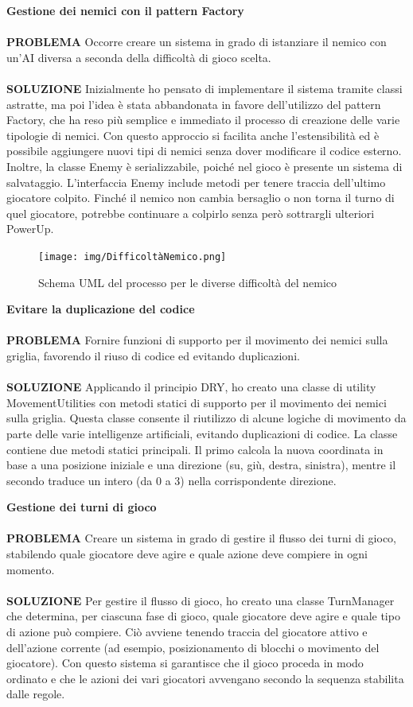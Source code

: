 \documentclass[a4paper,12pt]{report}
\begin{document}
\textbf{Gestione dei nemici con il pattern Factory}
\\
\\
\textbf{PROBLEMA}
Occorre creare un sistema in grado di istanziare il nemico con un’AI diversa a seconda della difficoltà di gioco scelta.
\\
\\
\textbf{SOLUZIONE}
Inizialmente ho pensato di implementare il sistema tramite classi astratte, ma poi l’idea è stata abbandonata in favore 
dell’utilizzo del pattern Factory, che ha reso più semplice e immediato il processo di creazione delle varie tipologie di nemici.
Con questo approccio si facilita anche l’estensibilità ed è possibile aggiungere nuovi tipi di nemici senza dover modificare 
il codice esterno. Inoltre, la classe Enemy è serializzabile, poiché nel gioco è presente un sistema di salvataggio.
L’interfaccia Enemy include metodi per tenere traccia dell’ultimo giocatore colpito. 
Finché il nemico non cambia bersaglio o non torna il turno di quel giocatore, 
potrebbe continuare a colpirlo senza però sottrargli ulteriori PowerUp.
\begin{figure}[H]
	\centering{}
	\texttt{[image: img/DifficoltàNemico.png]}
	\caption{Schema UML del processo per le diverse difficoltà del nemico}
	\label{img:Traduzione Informazioni}
\end{figure}
\textbf{Evitare la duplicazione del codice}
\\
\\
\textbf{PROBLEMA}
Fornire funzioni di supporto per il movimento dei nemici sulla griglia, favorendo il riuso di codice ed evitando duplicazioni.
\\
\\
\textbf{SOLUZIONE}
Applicando il principio DRY, ho creato una classe di utility MovementUtilities con metodi statici di supporto 
per il movimento dei nemici sulla griglia. Questa classe consente il riutilizzo di alcune logiche di movimento 
da parte delle varie intelligenze artificiali, evitando duplicazioni di codice.
La classe contiene due metodi statici principali. Il primo calcola la nuova coordinata in base a una posizione iniziale e
una direzione (su, giù, destra, sinistra), mentre il secondo traduce un intero (da 0 a 3) nella corrispondente direzione. 

\textbf{Gestione dei turni di gioco}
\\
\\
\textbf{PROBLEMA}
Creare un sistema in grado di gestire il flusso dei turni di gioco, stabilendo quale giocatore deve agire 
e quale azione deve compiere in ogni momento.
\\
\\
\textbf{SOLUZIONE}
Per gestire il flusso di gioco, ho creato una classe TurnManager che determina, per ciascuna fase di gioco, 
quale giocatore deve agire e quale tipo di azione può compiere. Ciò avviene tenendo traccia del giocatore attivo e 
dell’azione corrente (ad esempio, posizionamento di blocchi o movimento del giocatore).
Con questo sistema si garantisce che il gioco proceda in modo ordinato e che le azioni dei vari giocatori avvengano 
secondo la sequenza stabilita dalle regole.
\end{document}
